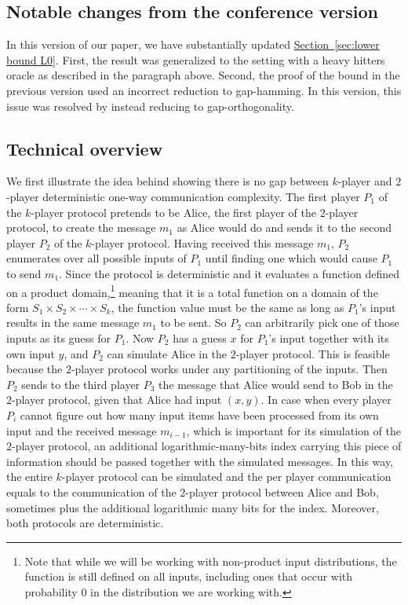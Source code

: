 \documentclass[11pt]{article}
\numberwithin{equation}{section}
\theoremstyle{definition}
\theoremstyle{plain}
\newcommand{\expref}[2]{\hyperref[#2]{#1~\ref{#2}}}
\begin{document}
%
\subsection{Notable changes from the conference version}
In this version of our paper, we have substantially updated \expref{Section}{sec:lower bound L0}. %
First,  %
the result was generalized to the setting with a heavy hitters oracle as described in the paragraph above. %
Second,  %
the proof of the bound in the previous version used an incorrect reduction to gap-hamming. In this version, this issue was resolved by instead reducing to gap-orthogonality.

\subsection{Technical overview}
We first illustrate the 
idea behind showing there is no gap between $k$-player and $2$-player
deterministic one-way communication complexity. The first player $P_1$
of the $k$-player protocol pretends to be Alice, the first player of the $2$-player protocol, 
to create the message $m_1$ as Alice would do
and sends it to the second player $P_2$ of the $k$-player protocol. 
Having received this message $m_1$,
$P_2$  enumerates over all possible
inputs of $P_1$ until finding one
which would cause $P_1$ to send $m_1$. 
Since the protocol is deterministic and it evaluates a function defined on a product domain,\footnote{{\color{black} Note that while we will be working with non-product input distributions, the function is still defined on all inputs, including ones that occur with probability 0 in the distribution we are working with.}} meaning that it is a total function on a domain of the form $S_1 \times S_2 \times \cdots \times S_k$, 
the function value must be the same as long as $P_1$'s input results in the same message $m_1$ to be sent.
So $P_2$ can arbitrarily pick one of those inputs as its guess for $P_1$.
Now $P_2$ has a guess $x$ for $P_1$'s input together
with its own input $y$, and $P_2$ can simulate Alice in the $2$-player protocol. 
This is feasible because the $2$-player protocol works under any partitioning of the inputs. 
Then $P_2$ sends to the third player $P_3$ the message that Alice would send to Bob in the $2$-player protocol, 
given that Alice had input $(x,y)$.
In case when every player $P_i$ cannot figure out how many input items have been processed from its own input and the received message $m_{i-1}$, which is important for its simulation of the $2$-player protocol,
an additional logarithmic-many-bits index carrying this piece of information should be passed together with the simulated messages.
In this way, the entire $k$-player protocol can be simulated
and the per player communication equals to the communication of the $2$-player protocol between Alice and Bob, sometimes plus the additional logarithmic many bits for the index. 
Moreover, both protocols are deterministic. 
\end{document}
